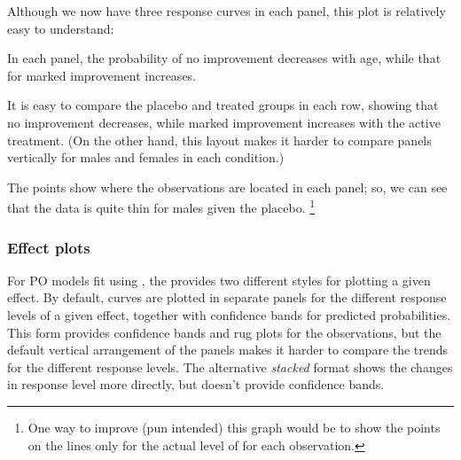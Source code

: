 \documentclass[11pt]{book}\usepackage[]{graphicx}\usepackage[]{color}
\begin{document}
Although we now have three response curves in each panel, this plot is relatively easy to understand:
\begin{seriate}
  \item In each panel, the probability of no improvement decreases with age, while that for marked improvement increases.
  \item It is easy to compare the placebo and treated groups in each row, showing that
  no improvement decreases, while marked improvement increases with the active treatment.
  (On the other hand, this layout makes it harder to compare panels vertically for males
  and females in each condition.)
  \item The points show where the observations are located in each panel; so, we can see that
  the data is quite thin for males given the placebo.%
\footnote{
One way to improve (pun intended)
this graph would be to show the points on the lines only for the actual
level of  for each observation.
}
\end{seriate}

\subsubsection{Effect plots}\label{sec:po-effplots}

For PO models fit using , the  provides two different
styles for plotting a given effect.  By default, curves are plotted 
in separate panels for the different response levels of a given effect, together with 
confidence bands for predicted probabilities.  This form provides confidence bands
and rug plots for the observations, but the default vertical arrangement of the panels
makes it harder to compare the trends for the different response levels.
The alternative \emph{stacked} format shows the changes in response level more directly, but
doesn't provide confidence bands.
\end{document}
